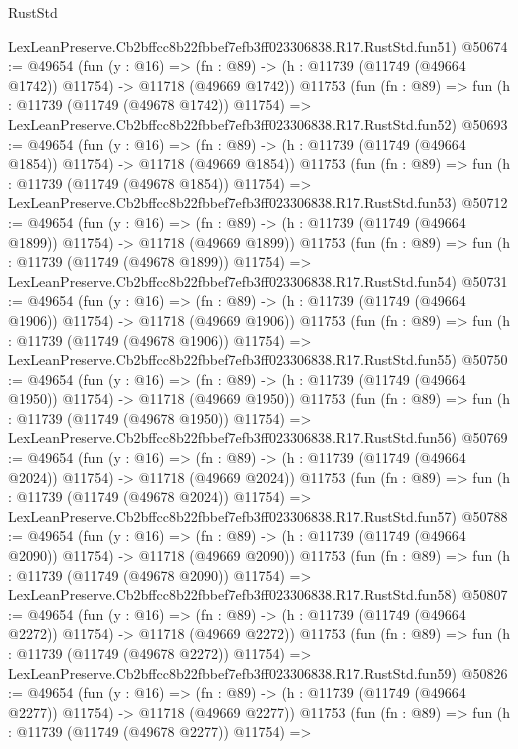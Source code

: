 \begin{lexlean}{RustStd}
\begin{coremodule}
    LexLeanPreserve.Cb2bffcc8b22fbbef7efb3ff023306838.R17.RustStd.fun51)
@50674 := @49654
    (fun (y : @16) =>
    (fn : @89) -> (h : @11739 (@11749 (@49664 @1742)) @11754) -> @11718 (@49669 @1742))
    @11753
    (fun (fn : @89) =>
    fun (h : @11739 (@11749 (@49678 @1742)) @11754) =>
    LexLeanPreserve.Cb2bffcc8b22fbbef7efb3ff023306838.R17.RustStd.fun52)
@50693 := @49654
    (fun (y : @16) =>
    (fn : @89) -> (h : @11739 (@11749 (@49664 @1854)) @11754) -> @11718 (@49669 @1854))
    @11753
    (fun (fn : @89) =>
    fun (h : @11739 (@11749 (@49678 @1854)) @11754) =>
    LexLeanPreserve.Cb2bffcc8b22fbbef7efb3ff023306838.R17.RustStd.fun53)
@50712 := @49654
    (fun (y : @16) =>
    (fn : @89) -> (h : @11739 (@11749 (@49664 @1899)) @11754) -> @11718 (@49669 @1899))
    @11753
    (fun (fn : @89) =>
    fun (h : @11739 (@11749 (@49678 @1899)) @11754) =>
    LexLeanPreserve.Cb2bffcc8b22fbbef7efb3ff023306838.R17.RustStd.fun54)
@50731 := @49654
    (fun (y : @16) =>
    (fn : @89) -> (h : @11739 (@11749 (@49664 @1906)) @11754) -> @11718 (@49669 @1906))
    @11753
    (fun (fn : @89) =>
    fun (h : @11739 (@11749 (@49678 @1906)) @11754) =>
    LexLeanPreserve.Cb2bffcc8b22fbbef7efb3ff023306838.R17.RustStd.fun55)
@50750 := @49654
    (fun (y : @16) =>
    (fn : @89) -> (h : @11739 (@11749 (@49664 @1950)) @11754) -> @11718 (@49669 @1950))
    @11753
    (fun (fn : @89) =>
    fun (h : @11739 (@11749 (@49678 @1950)) @11754) =>
    LexLeanPreserve.Cb2bffcc8b22fbbef7efb3ff023306838.R17.RustStd.fun56)
@50769 := @49654
    (fun (y : @16) =>
    (fn : @89) -> (h : @11739 (@11749 (@49664 @2024)) @11754) -> @11718 (@49669 @2024))
    @11753
    (fun (fn : @89) =>
    fun (h : @11739 (@11749 (@49678 @2024)) @11754) =>
    LexLeanPreserve.Cb2bffcc8b22fbbef7efb3ff023306838.R17.RustStd.fun57)
@50788 := @49654
    (fun (y : @16) =>
    (fn : @89) -> (h : @11739 (@11749 (@49664 @2090)) @11754) -> @11718 (@49669 @2090))
    @11753
    (fun (fn : @89) =>
    fun (h : @11739 (@11749 (@49678 @2090)) @11754) =>
    LexLeanPreserve.Cb2bffcc8b22fbbef7efb3ff023306838.R17.RustStd.fun58)
@50807 := @49654
    (fun (y : @16) =>
    (fn : @89) -> (h : @11739 (@11749 (@49664 @2272)) @11754) -> @11718 (@49669 @2272))
    @11753
    (fun (fn : @89) =>
    fun (h : @11739 (@11749 (@49678 @2272)) @11754) =>
    LexLeanPreserve.Cb2bffcc8b22fbbef7efb3ff023306838.R17.RustStd.fun59)
@50826 := @49654
    (fun (y : @16) =>
    (fn : @89) -> (h : @11739 (@11749 (@49664 @2277)) @11754) -> @11718 (@49669 @2277))
    @11753
    (fun (fn : @89) =>
    fun (h : @11739 (@11749 (@49678 @2277)) @11754) =>

\end{coremodule}
\end{lexlean}
